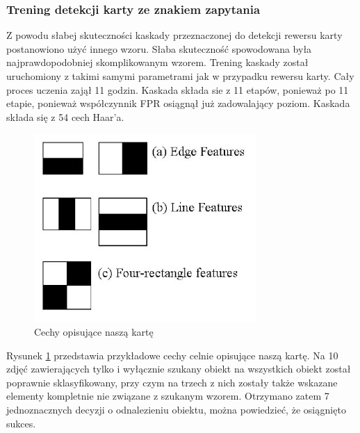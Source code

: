 \subsubsection{Trening detekcji karty ze znakiem zapytania}

Z powodu słabej skuteczności kaskady przeznaczonej do detekcji rewersu karty postanowiono użyć innego wzoru. Słaba skuteczność spowodowana była najprawdopodobniej skomplikowanym wzorem. Trening kaskady został uruchomiony z takimi samymi parametrami jak w przypadku rewersu karty. Cały proces uczenia zajął 11 godzin. Kaskada składa sie z 11 etapów, ponieważ po 11 etapie, ponieważ współczynnik FPR osiągnął już zadowalający poziom. Kaskada składa się z 54 cech Haar'a.

\begin{figure}[H]
\centering
\includegraphics[scale=0.2]{imgs/cechy?.png}
\caption{Cechy opisujące naszą kartę}
\label{fig:cechy?}
\end{figure}

Rysunek \ref{fig:cechy?} przedstawia przykładowe cechy celnie opisujące naszą kartę. Na 10 zdjęć zawierających tylko i wyłącznie szukany obiekt na wszystkich obiekt został poprawnie sklasyfikowany, przy czym na trzech z nich zostały także wskazane elementy kompletnie nie związane z szukanym wzorem. Otrzymano zatem 7 jednoznacznych decyzji o odnalezieniu obiektu, można powiedzieć, że osiągnięto sukces.
